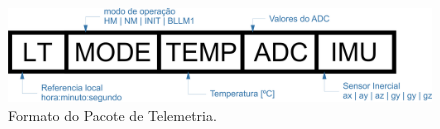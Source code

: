 \begin{figure}[h]
	\centering
	\caption{Formato do Pacote de Telemetria.}
	\includegraphics[keepaspectratio=true,scale=0.5]{figuras/telemetryPacket.png}
	
	\label{telemetryPacket}
\end{figure}

